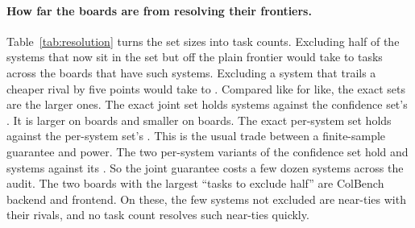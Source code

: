 \documentclass[11pt]{article}
\begin{document}
\paragraph{How far the boards are from resolving their frontiers.}
\begin{table}[!tbp]
\centering\small
\resizebox{\textwidth}{!}{}
\caption{Five frontier sets and two resolution numbers per board. Joint set: the confidence set of Section~\ref{sec:set}. Largest-margin and per-system: its two per-system variants. Exact, per system and exact, joint: the finite-sample sets of Section~\ref{sec:exactset}. Tasks to exclude half: the task count at which half of the systems now in the set but off the plain frontier would leave it, if their gaps to their strongest cheaper rival stayed as observed. Tasks for a 5-point lead: the task count at which a system trailing a cheaper rival by five accuracy points would be excluded, given the board's median paired noise.}
\label{tab:resolution}
\end{table}
Table~\ref{tab:resolution} turns the set sizes into task counts. Excluding half of the systems that now sit in the set but off the plain frontier would take \NumResTasksMedianMin{} to \NumResTasksMedianMax{} tasks across the boards that have such systems. Excluding a system that trails a cheaper rival by five points would take \NumResTasksFiveMin{} to \NumResTasksFiveMax{}. Compared like for like, the exact sets are the larger ones. The exact joint set holds \NumHalExactJointSet{} systems against the confidence set's \NumHalFrontierSet{}. It is larger on \NumHalBoardsExactJointLarger{} boards and smaller on \NumHalBoardsExactJointSmaller{} boards. The exact per-system set holds \NumHalExactSet{} against the per-system set's \NumHalPerSystemSet{}. This is the usual trade between a finite-sample guarantee and power. The two per-system variants of the confidence set hold \NumHalBoardwideSet{} and \NumHalPerSystemSet{} systems against its \NumHalFrontierSet{}. So the joint guarantee costs a few dozen systems across the audit. The two boards with the largest ``tasks to exclude half'' are ColBench backend and frontend. On these, the few systems not excluded are near-ties with their rivals, and no task count resolves such near-ties quickly.
\end{document}
